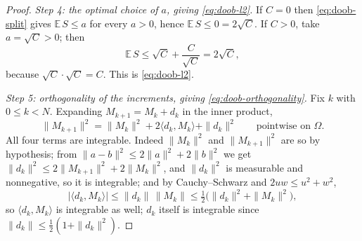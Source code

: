 \begin{proof}
\emph{Step 4: the optimal choice of $a$, giving \eqref{eq:doob-l2}.}
If $C=0$ then \eqref{eq:doob-split} gives $\mathbb E\,S\le a$ for every $a>0$,
hence $\mathbb E\,S\le0=2\sqrt C$. If $C>0$, take $a=\sqrt C>0$; then
\[
  \mathbb E\,S\le\sqrt C+\frac{C}{\sqrt C}=2\sqrt C,
\]
because $\sqrt C\cdot\sqrt C=C$. This is \eqref{eq:doob-l2}.

\emph{Step 5: orthogonality of the increments, giving
\eqref{eq:doob-orthogonality}.}
Fix $k$ with $0\le k<N$. Expanding $M_{k+1}=M_k+d_k$ in the inner product,
\begin{equation}\label{eq:doob-expand}
  \|M_{k+1}\|^2=\|M_k\|^2+2\langle d_k,M_k\rangle+\|d_k\|^2
  \qquad\text{pointwise on }\Omega.
\end{equation}
All four terms are integrable. Indeed $\|M_k\|^2$ and $\|M_{k+1}\|^2$ are so by
hypothesis; from $\|a-b\|^2\le2\|a\|^2+2\|b\|^2$ we get
$\|d_k\|^2\le2\|M_{k+1}\|^2+2\|M_k\|^2$, and $\|d_k\|^2$ is measurable and
nonnegative, so it is integrable; and by Cauchy--Schwarz and
$2uw\le u^2+w^2$,
\[
  |\langle d_k,M_k\rangle|\le\|d_k\|\,\|M_k\|
    \le\tfrac12\bigl(\|d_k\|^2+\|M_k\|^2\bigr),
\]
so $\langle d_k,M_k\rangle$ is integrable as well; $d_k$ itself is integrable
since $\|d_k\|\le\tfrac12(1+\|d_k\|^2)$.


\end{proof}
